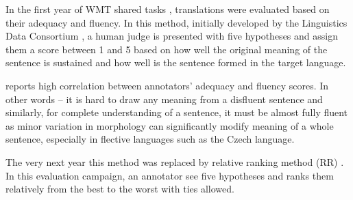 In the first year of WMT shared tasks \citep{koehn-monz:2006:WMT}, translations
were evaluated based on their adequacy and fluency. In this method, initially  
developed by the Linguistics Data Consortium ,  a human judge 
is presented with five hypotheses and assign them a score between 1 and 5 based 
on how well the original meaning of the sentence is sustained and how well is the 
sentence formed in the target language.

\cite{callison-burch-etal-2007-meta} reports high correlation between annotators’ 
adequacy and fluency scores. In other words -- it is hard to draw any meaning
from a disfluent sentence and similarly, for complete understanding of a sentence,
it must be almost fully fluent as minor variation in morphology can significantly
modify meaning of a whole sentence, especially in flective languages such as the 
Czech language. 

The very next year this method was replaced by relative ranking method (RR) 
\citep{callison-burch-etal-2007-meta}. In this evaluation campaign, an 
annotator see five hypotheses and ranks them relatively from the best to the 
worst with ties allowed.



